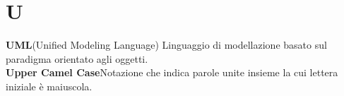 \newpage
\section{U}\label{l:U}
\textbf{UML}\newline (Unified Modeling Language) Linguaggio di modellazione basato sul paradigma orientato agli oggetti.\\
\newline
\textbf{Upper Camel Case}\newline Notazione che indica parole unite insieme la cui lettera iniziale è maiuscola.